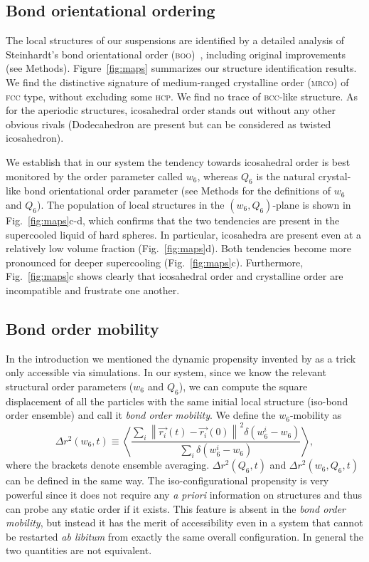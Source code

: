 \subsection*{Bond orientational ordering}

The local structures of our suspensions are identified by a detailed analysis of Steinhardt's bond orientational order (\textsc{boo})~\citep{steinhardt1983boo}, including original improvements (see Methods). Figure~\ref{fig:maps} summarizes our structure identification results. We find the distinctive signature of medium-ranged crystalline order (\textsc{mrco}) of \textsc{fcc} type, without excluding some \textsc{hcp}. We find no trace of \textsc{bcc}-like structure. As for the aperiodic structures, icosahedral order stands out without any other obvious rivals (Dodecahedron are present but can be considered as twisted icosahedron).


We establish that in our system the tendency towards icosahedral order is best monitored by the order parameter called $w_6$, whereas $Q_6$ is the natural crystal-like bond 
orientational order parameter (see Methods for the definitions of $w_6$ and $Q_6$). The population of local structures in the $(w_6,Q_6)$-plane is shown in Fig.~\ref{fig:maps}c-d, which confirms that the two tendencies are present in the supercooled liquid of hard spheres. In particular, icosahedra are present even at a relatively low volume fraction (Fig.~\ref{fig:maps}d). Both tendencies become more pronounced for deeper supercooling (Fig.~\ref{fig:maps}c). Furthermore, Fig.~\ref{fig:maps}c shows clearly that icosahedral order and crystalline order are incompatible and frustrate one another.


\subsection*{Bond order mobility}
In the introduction we mentioned the dynamic propensity invented by \citet{Widmer-Cooper2005} as a trick only accessible via simulations. In our system, since we know the relevant structural order parameters ($w_6$ and $Q_6$), we can compute the square displacement of all the particles with the same initial local structure (iso-bond order ensemble) and call it \emph{bond order mobility}. We define the $w_6$-mobility as
\begin{equation}
	\Delta r^2(w_6, t) \equiv \left\langle \frac{
		\sum\limits_i{
			\left\|\vec{r_i}(t)-\vec{r_i}(0)\right\|^2 \delta(w_6^i-w_6)
			}
	}{
		\sum\limits_i{\delta(w_6^i-w_6)}
	}\right\rangle, 
	\label{eq:bo_propensity}
\end{equation}
where the brackets denote ensemble averaging. $\Delta r^2(Q_6, t)$ and $\Delta r^2(w_6, Q_6, t)$ can be defined in the same way. 
The iso-configurational propensity is very powerful since it does not require any {\it a priori} information on structures and thus can probe any static order if it exists. This feature is absent in the \emph{bond order mobility}, but instead it has the merit of accessibility even in a system that cannot be restarted \emph{ab libitum} from exactly the same overall configuration. In general the two quantities are not equivalent.

